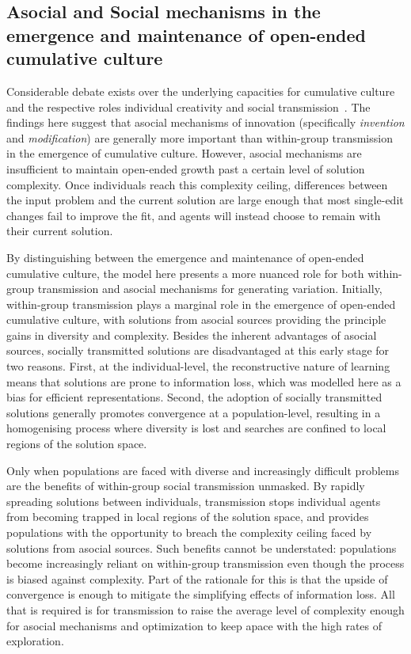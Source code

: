 \documentclass{article}
\begin{document}
\subsection{Asocial and Social mechanisms in the emergence and maintenance of open-ended cumulative culture}
Considerable debate exists over the underlying capacities for cumulative culture and the respective roles individual creativity and social transmission~\cite{xxxtomasello,enquist2011modelling,lewis2012transmission,charbonneau_all_2015,zwirner2015cognitive}. The findings here suggest that asocial mechanisms of innovation (specifically {\em invention} and {\em modification}) are generally more important than within-group transmission in the emergence of cumulative culture. However, asocial mechanisms are insufficient to maintain open-ended growth past a certain level of solution complexity. Once individuals reach this complexity ceiling, differences between the input problem and the current solution are large enough that most single-edit changes fail to improve the fit, and agents will instead choose to remain with their current solution.

By distinguishing between the emergence and maintenance of open-ended cumulative culture, the model here presents a more nuanced role for both within-group transmission and asocial mechanisms for generating variation. Initially, within-group transmission plays a marginal role in the emergence of open-ended cumulative culture, with solutions from asocial sources providing the principle gains in diversity and complexity. Besides the inherent advantages of asocial sources, socially transmitted solutions are disadvantaged at this early stage for two reasons. First, at the individual-level, the reconstructive nature of learning means that solutions are prone to information loss, which was modelled here as a bias for efficient representations. Second, the adoption of socially transmitted solutions generally promotes convergence at a population-level, resulting in a homogenising process where diversity is lost and searches are confined to local regions of the solution space.

Only when populations are faced with diverse and increasingly difficult problems are the benefits of within-group social transmission unmasked. By rapidly spreading solutions between individuals, transmission stops individual agents from becoming trapped in local regions of the solution space, and provides populations with the opportunity to breach the complexity ceiling faced by solutions from asocial sources. Such benefits cannot be understated: populations become increasingly reliant on within-group transmission even though the process is biased against complexity. Part of the rationale for this is that the upside of convergence is enough to mitigate the simplifying effects of information loss. All that is required is for transmission to raise the average level of complexity enough for asocial mechanisms and optimization to keep apace with the high rates of exploration.
\end{document}
